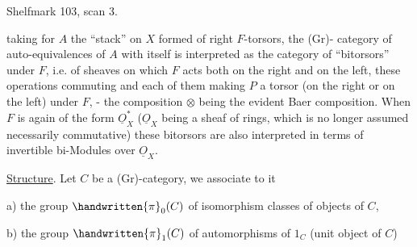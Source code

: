 Shelfmark 103, scan 3.


taking for $A$ the ``stack'' on $X$ formed of right $F$-torsors, the (Gr)- category of auto-equivalences of $A$ with itself is interpreted as the category of ``bitorsors'' under $F$, i.e. of sheaves  on which $F$ acts both on the right and on the left, these operations commuting and each of them making $P$ a torsor (on the right or on the left) under $F$, - the composition $\otimes$ being the evident Baer composition. When $F$ is again of the form $\underline{O}_{X}^{*}$ ($\underline{O}_{X}$ being a sheaf of rings, which is no longer assumed necessarily commutative) these bitorsors are also interpreted in terms of invertible bi-Modules over $\underline{O}_{X}$.

\uline{Structure}.  Let $C$ be a (Gr)-category, we associate to it

a) the group $\handwritten{\pi}_{0}(C)$ of isomorphism classes of objects of $C$,

b) the group $\handwritten{\pi}_{1}(C)$ of automorphisms of $1_C$ (unit object of $C$)


